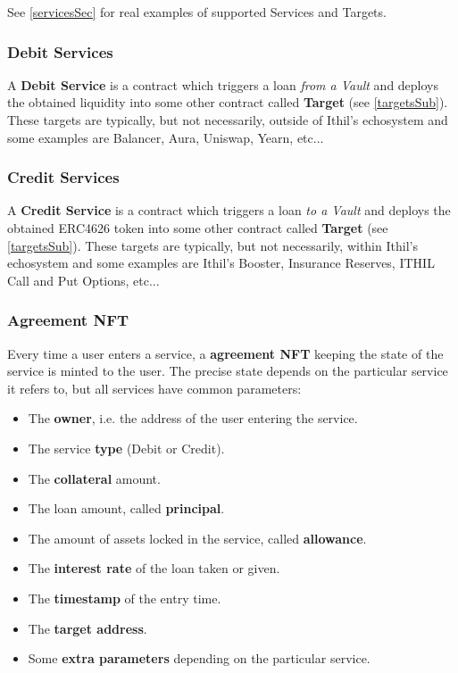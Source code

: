 \documentclass[a4paper,10 pt]{article}
\theoremstyle{definition}
\begin{document}
See \ref{servicesSec} for real examples of supported Services and Targets.
\subsubsection{Debit Services}\label{debitSubSub}
A {\bf Debit Service} is a contract which triggers a loan {\it from a Vault} and deploys the obtained liquidity into some other contract called {\bf Target} (see \ref{targetsSub}). These targets are typically, but not necessarily, outside of Ithil's echosystem and some examples are Balancer, Aura, Uniswap, Yearn, etc...

\subsubsection{Credit Services}\label{creditSubSub}
A {\bf Credit Service} is a contract which triggers a loan {\it to a Vault} and deploys the obtained ERC4626 token into some other contract called {\bf Target} (see \ref{targetsSub}). These targets are typically, but not necessarily, within Ithil's echosystem and some examples are Ithil's Booster, Insurance Reserves, ITHIL Call and Put Options, etc...

\subsubsection{Agreement NFT}\label{posNftSubSub}

Every time a user enters a service, a {\bf agreement NFT} keeping the state of the service is minted to the user. The precise state depends on the particular service it refers to, but all services have common parameters:
\begin{itemize}
\item The {\bf owner}, i.e. the address of the user entering the service.
\item The service {\bf type} (Debit or Credit).
\item The {\bf collateral} amount.
\item The loan amount, called {\bf principal}.
\item The amount of assets locked in the service, called {\bf allowance}.
\item The {\bf interest rate} of the loan taken or given.
\item The {\bf timestamp} of the entry time.
\item The {\bf target address}.
\item Some {\bf extra parameters} depending on the particular service.
\end{itemize}
\end{document}
